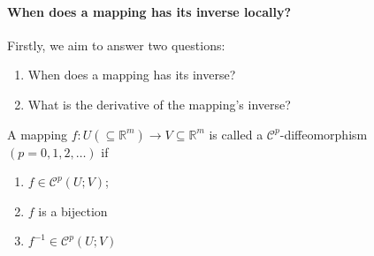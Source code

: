 \paragraph{When does a mapping has its inverse locally?}
Firstly, we aim to answer two questions:
\begin{enumerate}
\item
When does a mapping has its inverse?
\item
What is the derivative of the mapping's inverse?
\end{enumerate}
\begin{definition}[diffeomorphism]
A mapping $f:U(\subseteq\mathbb{R}^m)\to V\subseteq\mathbb{R}^m$ is called a $\mathcal{C}^p$-diffeomorphism $(p=0,1,2,\dots)$ if
\begin{enumerate}
\item
$f\in\mathcal{C}^p(U;V)$;
\item
$f$ is a bijection
\item
$f^{-1}\in\mathcal{C}^p(U;V)$
\end{enumerate}
\end{definition}

